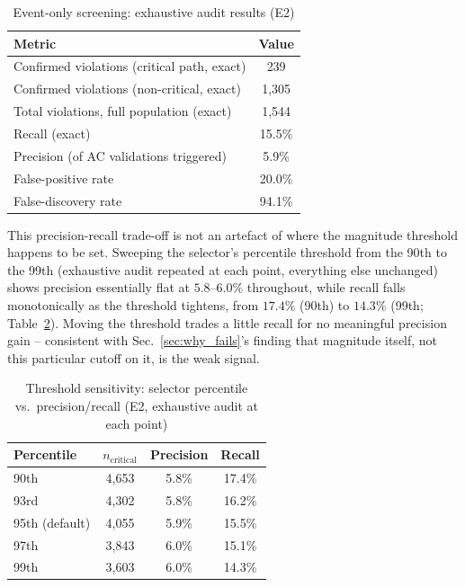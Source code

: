\documentclass[11pt,conference]{IEEEtran}
\begin{document}
\begin{table}[htbp]
\caption{Event-only screening: exhaustive audit results (E2)}
\label{tab:recall}
\centering
\begin{tabular}{@{}lc@{}}
\toprule
\textbf{Metric} & \textbf{Value} \\ \midrule
Confirmed violations (critical path, exact) & 239 \\
Confirmed violations (non-critical, exact) & 1{,}305 \\
Total violations, full population (exact) & 1{,}544 \\
Recall (exact) & 15.5\% \\
Precision (of AC validations triggered) & 5.9\% \\
False-positive rate & 20.0\% \\
False-discovery rate & 94.1\% \\ \bottomrule
\end{tabular}
\end{table}

This precision-recall trade-off is not an artefact of where the magnitude threshold happens to be
set. Sweeping the selector's percentile threshold from the 90th to the 99th (exhaustive audit
repeated at each point, everything else unchanged) shows precision essentially flat at
$5.8$--$6.0\%$ throughout, while recall falls monotonically as the threshold tightens, from $17.4\%$
(90th) to $14.3\%$ (99th; Table~\ref{tab:threshold_sens}). Moving the threshold trades a little
recall for no meaningful precision gain -- consistent with Sec.~\ref{sec:why_fails}'s finding that
magnitude itself, not this particular cutoff on it, is the weak signal.

\begin{table}[htbp]
\caption{Threshold sensitivity: selector percentile vs.\ precision/recall (E2, exhaustive audit at each point)}
\label{tab:threshold_sens}
\centering
\small
\begin{tabular}{@{}lccc@{}}
\toprule
\textbf{Percentile} & \textbf{$n_{\mathrm{critical}}$} & \textbf{Precision} & \textbf{Recall} \\ \midrule
90th & 4,653 & 5.8\% & 17.4\% \\
93rd & 4,302 & 5.8\% & 16.2\% \\
95th (default) & 4,055 & 5.9\% & 15.5\% \\
97th & 3,843 & 6.0\% & 15.1\% \\
99th & 3,603 & 6.0\% & 14.3\% \\ \bottomrule
\end{tabular}
\end{table}
\end{document}
